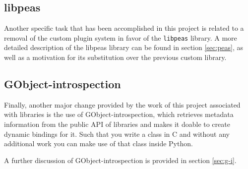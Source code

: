 \subsection{libpeas}\label{sec:libpeas}

Another specific task that has been accomplished in this project is related to a removal of the 
custom plugin system in favor of the \texttt{libpeas} library.  A more detailed description of the 
libpeas library can be found in section \ref{sec:peas}, as well as a motivation for its substitution 
over the previous custom library.


\subsection{GObject-introspection}\label{sec:GObjectIntrospection}

Finally, another major change provided by the work of this project associated with libraries 
is the use of GObject-introspection, which retrieves metadata information from the public API of 
libraries and makes it doable to create dynamic bindings for it. Such that you write a class in
C and without any additional work you can make use of that class inside Python.

A further discussion of GObject-introspection is provided in section \ref{sec:g-i}.

